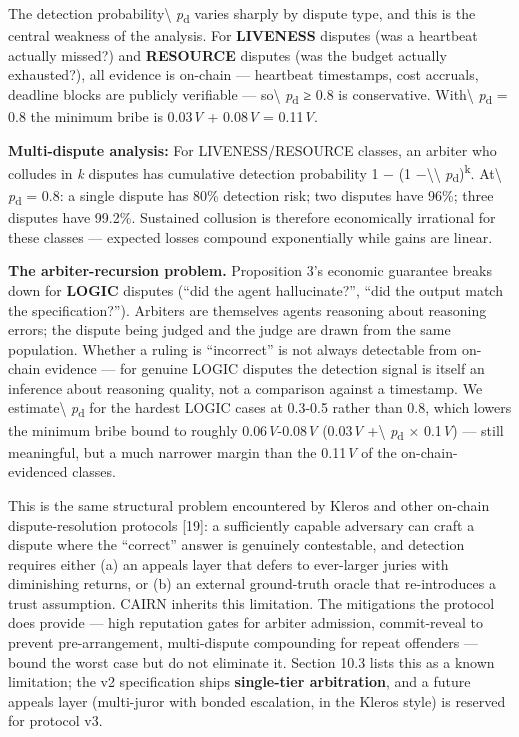 \documentclass[
  10pt,
]{article}
\begin{document}
The detection probability\textbackslash{} \emph{p}\textsubscript{d}
varies sharply by dispute type, and this is the central weakness of the
analysis. For \textbf{LIVENESS} disputes (was a heartbeat actually
missed?) and \textbf{RESOURCE} disputes (was the budget actually
exhausted?), all evidence is on-chain --- heartbeat timestamps, cost
accruals, deadline blocks are publicly verifiable --- so\textbackslash{}
\emph{p}\textsubscript{d} ≥ 0.8 is conservative. With\textbackslash{}
\emph{p}\textsubscript{d} = 0.8 the minimum bribe is 0.03\emph{V} +
0.08\emph{V} = 0.11\emph{V}.

\textbf{Multi-dispute analysis:} For LIVENESS/RESOURCE classes, an
arbiter who colludes in \emph{k} disputes has cumulative detection
probability 1 − (1 −\textbackslash\textbackslash{}
\emph{p}\textsubscript{d})\textsuperscript{k}. At\textbackslash{}
\emph{p}\textsubscript{d} = 0.8: a single dispute has 80\% detection
risk; two disputes have 96\%; three disputes have 99.2\%. Sustained
collusion is therefore economically irrational for these classes ---
expected losses compound exponentially while gains are linear.

\textbf{The arbiter-recursion problem.} Proposition 3's economic
guarantee breaks down for \textbf{LOGIC} disputes (``did the agent
hallucinate?'', ``did the output match the specification?''). Arbiters
are themselves agents reasoning about reasoning errors; the dispute
being judged and the judge are drawn from the same population. Whether a
ruling is ``incorrect'' is not always detectable from on-chain evidence
--- for genuine LOGIC disputes the detection signal is itself an
inference about reasoning quality, not a comparison against a timestamp.
We estimate\textbackslash{} \emph{p}\textsubscript{d} for the hardest
LOGIC cases at 0.3-0.5 rather than 0.8, which lowers the minimum bribe
bound to roughly 0.06\emph{V}-0.08\emph{V} (0.03\emph{V}
+\textbackslash{} \emph{p}\textsubscript{d} × 0.1\emph{V}) --- still
meaningful, but a much narrower margin than the 0.11\emph{V} of the
on-chain-evidenced classes.

This is the same structural problem encountered by Kleros and other
on-chain dispute-resolution protocols {[}19{]}: a sufficiently capable
adversary can craft a dispute where the ``correct'' answer is genuinely
contestable, and detection requires either (a) an appeals layer that
defers to ever-larger juries with diminishing returns, or (b) an
external ground-truth oracle that re-introduces a trust assumption.
CAIRN inherits this limitation. The mitigations the protocol does
provide --- high reputation gates for arbiter admission, commit-reveal
to prevent pre-arrangement, multi-dispute compounding for repeat
offenders --- bound the worst case but do not eliminate it. Section 10.3
lists this as a known limitation; the v2 specification ships
\textbf{single-tier arbitration}, and a future appeals layer
(multi-juror with bonded escalation, in the Kleros style) is reserved
for protocol v3.
\end{document}
